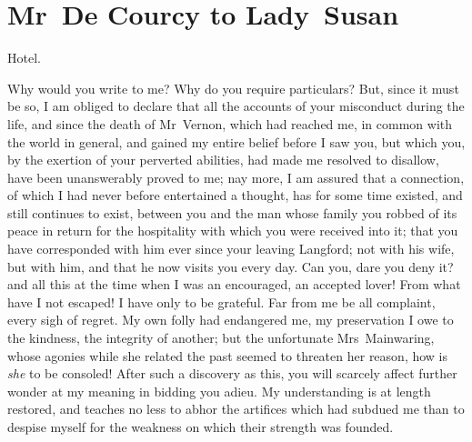\chapter{Mr~De Courcy to Lady~Susan}
  
  \begin{mail}{\doubleemdash  Hotel.}{}

Why would you write to me? Why do you require particulars? But, since it must be so, I am obliged to declare that all the accounts of your misconduct during the life, and since the death of Mr~Vernon, which had reached me, in common with the world in general, and gained my entire belief before I saw you, but which you, by the exertion of your perverted abilities, had made me resolved to disallow, have been unanswerably proved to me; nay more, I am assured that a connection, of which I had never before entertained a thought, has for some time existed, and still continues to exist, between you and the man whose family you robbed of its peace in return for the hospitality with which you were received into it; that you have corresponded with him ever since your leaving Langford; not with his wife, but with him, and that he now visits you every day. Can you, dare you deny it? and all this at the time when I was an encouraged, an accepted lover! From what have I not escaped! I have only to be grateful. Far from me be all complaint, every sigh of regret. My own folly had endangered me, my preservation I owe to the kindness, the integrity of another; but the unfortunate Mrs~Mainwaring, whose agonies while she related the past seemed to threaten her reason, how is \textit{she} to be consoled! After such a discovery as this, you will scarcely affect further wonder at my meaning in bidding you adieu. My understanding is at length restored, and teaches no less to abhor the artifices which had subdued me than to despise myself for the weakness on which their strength was founded. 

\end{mail}